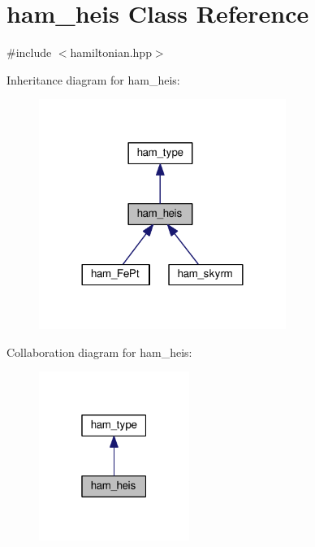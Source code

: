 \hypertarget{classham__heis}{}\section{ham\+\_\+heis Class Reference}
\label{classham__heis}


{\ttfamily \#include $<$hamiltonian.\+hpp$>$}



Inheritance diagram for ham\+\_\+heis\+:\nopagebreak
\begin{figure}[H]
\begin{center}
\leavevmode
\includegraphics[width=228pt]{db/d7e/classham__heis__inherit__graph}
\end{center}
\end{figure}


Collaboration diagram for ham\+\_\+heis\+:\nopagebreak
\begin{figure}[H]
\begin{center}
\leavevmode
\includegraphics[width=139pt]{d0/d9a/classham__heis__coll__graph}
\end{center}
\end{figure}

